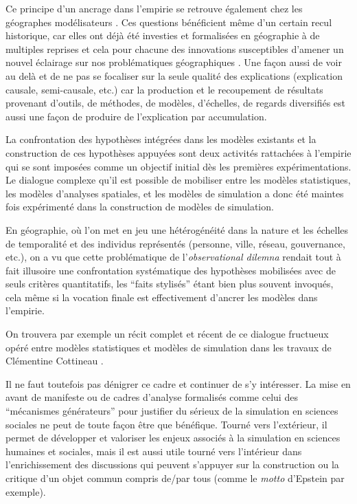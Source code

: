 Ce principe d'un ancrage dans l'empirie se retrouve également chez les géographes modélisateurs \autocite{Banos2013}. Ces questions bénéficient même d'un certain recul historique, car elles ont déjà été investies et formalisées en géographie à de multiples reprises et cela pour chacune des innovations susceptibles d'amener un nouvel éclairage sur nos problématiques géographiques \autocite{Sanders2000, Mathian2014}. Une façon aussi de voir au delà et de ne pas se focaliser sur la seule qualité des explications (explication causale, semi-causale, etc.) car la production et le recoupement de résultats provenant d'outils, de méthodes, de modèles, d'échelles, de regards diversifiés est aussi une façon de produire de l'explication par accumulation.

La confrontation des hypothèses intégrées dans les modèles existants \autocite{Pumain1983, Sanders1984} et la construction de ces hypothèses appuyées \autocite{AMORAL1983} sont deux activités rattachées à l'empirie qui se sont imposées comme un objectif initial dès les premières expérimentations. Le dialogue complexe qu'il est possible de mobiliser entre les modèles statistiques, les modèles d'analyses spatiales, et les modèles de simulation a donc été maintes fois expérimenté dans la construction de modèles de simulation.

En géographie, où l'on met en jeu une hétérogénéité dans la nature et les échelles de temporalité et des individus représentés (personne, ville, réseau, gouvernance, etc.), on a vu que cette problématique de l'\textit{observational dilemna} rendait tout à fait illusoire une confrontation systématique des hypothèses mobilisées avec de seuls critères quantitatifs, les \enquote{faits stylisés} étant bien plus souvent invoqués, cela même si la vocation finale est effectivement d'ancrer les modèles dans l'empirie.

On trouvera par exemple un récit complet et récent de ce dialogue fructueux opéré entre modèles statistiques et modèles de simulation dans les travaux de Clémentine Cottineau \autocites{Cottineau2014a, Cottineau2014b}.

Il ne faut toutefois pas dénigrer ce cadre et continuer de s'y intéresser. La mise en avant de manifeste \textcite{Conte2012} ou de cadres d'analyse formalisés comme celui des \enquote{mécanismes générateurs} pour justifier du sérieux de la simulation en sciences sociales ne peut de toute façon être que bénéfique. Tourné vers l'extérieur, il permet de développer et valoriser les enjeux associés à la simulation en sciences humaines et sociales, mais il est aussi utile tourné vers l'intérieur dans l'enrichissement des discussions qui peuvent s'appuyer sur la construction ou la critique d'un objet commun compris de/par tous (comme le \textit{motto} d'Epstein par exemple).

